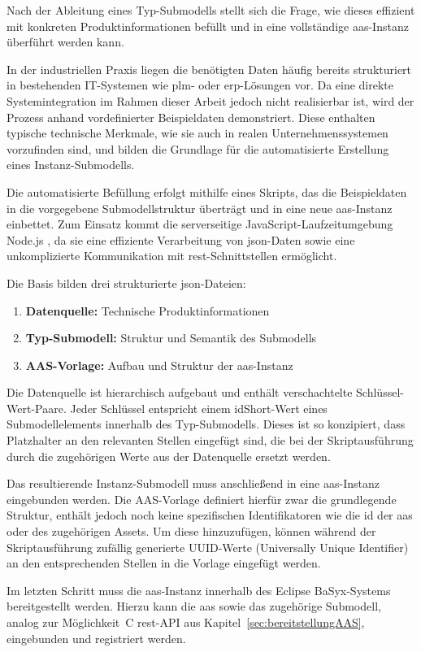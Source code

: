 Nach der Ableitung eines Typ-Submodells stellt sich die Frage, wie dieses effizient mit konkreten Produktinformationen befüllt und in eine vollständige \acs{aas}-Instanz überführt werden kann.

In der industriellen Praxis liegen die benötigten Daten häufig bereits strukturiert in bestehenden IT-Systemen wie \acs{plm}- oder \acs{erp}-Lösungen vor.
Da eine direkte Systemintegration im Rahmen dieser Arbeit jedoch nicht realisierbar ist, wird der Prozess anhand vordefinierter Beispieldaten demonstriert.
Diese enthalten typische technische Merkmale, wie sie auch in realen Unternehmenssystemen vorzufinden sind, und bilden die Grundlage für die automatisierte Erstellung eines Instanz-Submodells.

Die automatisierte Befüllung erfolgt mithilfe eines Skripts, das die Beispieldaten in die vorgegebene Submodellstruktur überträgt und in eine neue \acs{aas}-Instanz einbettet.
Zum Einsatz kommt die serverseitige JavaScript-Laufzeitumgebung Node.js \cite{nodejs}, da sie eine effiziente Verarbeitung von \acs{json}-Daten sowie eine unkomplizierte Kommunikation mit \acs{rest}-Schnittstellen ermöglicht.

Die Basis bilden drei strukturierte \acs{json}-Dateien:

\begin{enumerate}[noitemsep, leftmargin=*, label=\textbf{\arabic*.}]
    \item \textbf{Datenquelle:} Technische Produktinformationen
    \item \textbf{Typ-Submodell:} Struktur und Semantik des Submodells
    \item \textbf{AAS-Vorlage:} Aufbau und Struktur der \acs{aas}-Instanz
\end{enumerate}

Die Datenquelle ist hierarchisch aufgebaut und enthält verschachtelte Schlüssel-Wert-Paare.
Jeder Schlüssel entspricht einem idShort-Wert eines Submodellelements innerhalb des Typ-Submodells.
Dieses ist so konzipiert, dass Platzhalter an den relevanten Stellen eingefügt sind, die bei der Skriptausführung durch die zugehörigen Werte aus der Datenquelle ersetzt werden.

Das resultierende Instanz-Submodell muss anschließend in eine \acs{aas}-Instanz eingebunden werden.
Die AAS-Vorlage definiert hierfür zwar die grundlegende Struktur, enthält jedoch noch keine spezifischen Identifikatoren wie die \acs{id} der \acs{aas} oder des zugehörigen Assets.
Um diese hinzuzufügen, können während der Skriptausführung zufällig generierte UUID-Werte (Universally Unique Identifier) an den entsprechenden Stellen in die Vorlage eingefügt werden.

Im letzten Schritt muss die \acs{aas}-Instanz innerhalb des Eclipse BaSyx-Systems bereitgestellt werden.
Hierzu kann die \acs{aas} sowie das zugehörige Submodell, analog zur Möglichkeit~C \acs{rest}-API aus Kapitel~\ref{sec:bereitstellungAAS}, eingebunden und registriert werden.